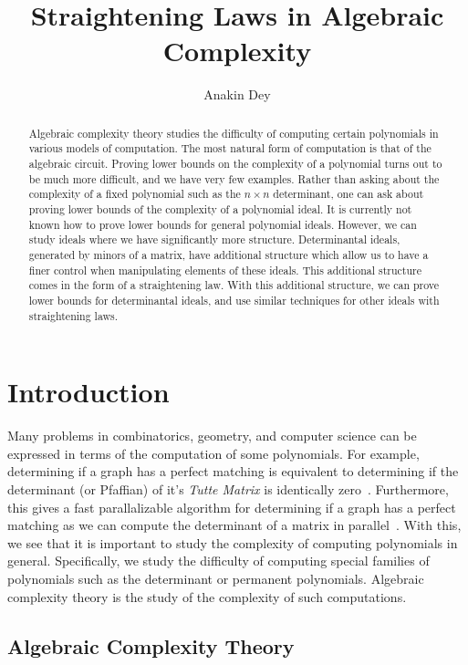 \documentclass[letterpaper, 11pt]{amsart}
\title{Straightening Laws in Algebraic Complexity}
\author{Anakin Dey}
\newif\iffull
\begin{document}
\begin{abstract}
  Algebraic complexity theory studies the difficulty of computing certain polynomials in various models of computation.
  The most natural form of computation is that of the algebraic circuit.
  Proving lower bounds on the complexity of a polynomial turns out to be much more difficult, and we have very few examples.
  Rather than asking about the complexity of a fixed polynomial such as the $n \times n$ determinant, one can ask about proving lower bounds of the complexity of a polynomial ideal.
  It is currently not known how to prove lower bounds for general polynomial ideals.
  However, we can study ideals where we have significantly more structure.
  Determinantal ideals, generated by minors of a matrix, have additional structure which allow us to have a finer control when manipulating elements of these ideals.
  This additional structure comes in the form of a straightening law.
  With this additional structure, we can prove lower bounds for determinantal ideals, and use similar techniques for other ideals with straightening laws.
\end{abstract}

\maketitle

\iffull
\tableofcontents
\clearpage
\fi

\section{Introduction}

Many problems in combinatorics, geometry, and computer science can be expressed in terms of the computation of some polynomials.
For example, determining if a graph has a perfect matching is equivalent to determining if the determinant (or Pfaffian) of it's \emph{Tutte Matrix} is identically zero~\cite{Tut47}.
Furthermore, this gives a fast parallalizable algorithm for determining if a graph has a perfect matching as we can compute the determinant of a matrix in parallel~\cite{Csa76}.
With this, we see that it is important to study the complexity of computing polynomials in general.
Specifically, we study the difficulty of computing special families of polynomials such as the determinant or permanent polynomials.
Algebraic complexity theory is the study of the complexity of such computations.

\subsection{Algebraic Complexity Theory}
\end{document}

